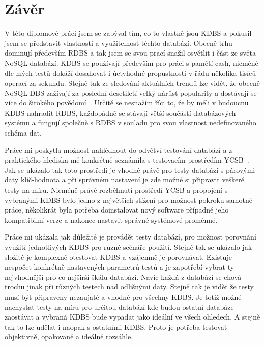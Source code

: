 \documentclass[czech,master,dept460,male,csharp,cpdeclaration]{diploma}
\begin{document}
	\chapter{Závěr\label{chapter:5-diploma_results}}
	
	V této diplomové práci jsem se zabýval tím, co to vlastně jsou KDBS a pokusil jsem se představit vlastnosti a využitelnost těchto databází. Obecně trhu dominují především RDBS a tak jsem se svou prací snažil osvětlit i část ze světa NoSQL databází. KDBS se používají především pro práci s pamětí cash, nicméně dle mých testů dokáží dosahovat i úctyhodné propustnosti v řádu několika tisíců operací za sekundu. Stejně tak ze sledování aktuálních trendů lze vidět, že obecně NoSQL DBS zažívají za poslední desetiletí velký nárůst popularity a dostávají se více do širokého povědomí~\cite{dbranking-trend-by-model}. Určitě se nesnažím říci to, že by měli v budoucnu KDBS nahradit RDBS, každopádně se stávají větší součástí databázových systému a fungují společně s RDBS v souladu pro svou vlastnost nedefinovaného schéma dat.
	
	Práce mi poskytla možnost nahlédnout do odvětví testování databází a z praktického hlediska mě konkrétně seznámila s testovacím prostředím YCSB~\cite{ycsb}. Jak se ukázalo tak toto prostředí je vhodné právě pro testy databází s párovými daty klíč-hodnota a při správném nastavení je zde možné si připravit veškeré testy na míru. Nicméně právě rozběhnutí prostředí YCSB a propojení s vybranými KDBS bylo jedno z největších stížení pro možnost pokroku samotné práce, několikrát byla potřeba doinstalovat nový software případně jeho kompatibilní verze a nakonec nastavit správné systémové proměnné.
	
	Práce mi ukázala jak důležité je provádět testy databází, pro možnost porovnání využití jednotlivých KDBS pro různé scénáře použití. Stejně tak se ukázalo jak složité je komplexně otestovat KDBS a vzájemně je porovnávat. Existuje nespočet konkrétně nastavených parametrů testů a je zapotřebí vybrat ty nejvhodnější pro co nejširší škálu databází. Navíc každá z databází se chová trochu jinak při různých testech nad odlišnými daty. Stejně tak je vidět že testy musí být připraveny nezaujatě a vhodně pro všechny KDBS. Je totiž možné nachystat testy na míru pro určitou databází kde budou ostatní databáze zaostávat a vybraná KDBS bude vypadat jako ideální ve všech ohledech. A stejně tak to lze udělat i naopak s ostatními KDBS. Proto je potřeba testovat objektivně, opakovaně a ideálně rozsáhle.
	
\end{document}
